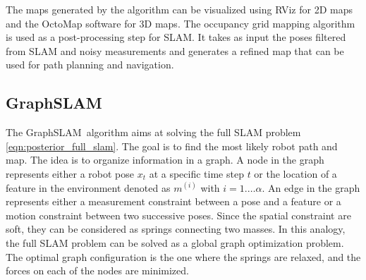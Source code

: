\documentclass[10pt, journal, compsoc]{IEEEtran}
\newcommand{\gs}{GraphSLAM}
\begin{document}
The maps generated by the algorithm can be visualized using RViz for 2D maps and the OctoMap software \cite{hornung13auro} for 3D maps. The occupancy grid mapping algorithm is used as a post-processing step for SLAM. It takes as input the poses filtered from SLAM and noisy measurements and generates a refined map that can be used for path planning and navigation.

\subsection{\gs}
\label{sec:graph_slam}
The \gs\ algorithm aims at solving the full SLAM problem \ref{eqn:posterior_full_slam}. The goal is to find the most likely robot path and map. The idea is to organize information in a graph. A node in the graph represents either a robot pose $x_t$ at a specific time step $t$ or the location of a feature in the environment denoted as $m^{\left(i\right)}$ with $i = 1. \ldots \alpha$. An edge in the graph represents either a measurement constraint between a pose and a feature or a motion constraint between two successive poses. Since the spatial constraint are soft, they can be considered as springs connecting two masses. In this analogy, the full SLAM problem can be solved as a global graph optimization problem. The optimal graph configuration is the one where the springs are relaxed, and the forces on each of the nodes are minimized. 

\end{document}
